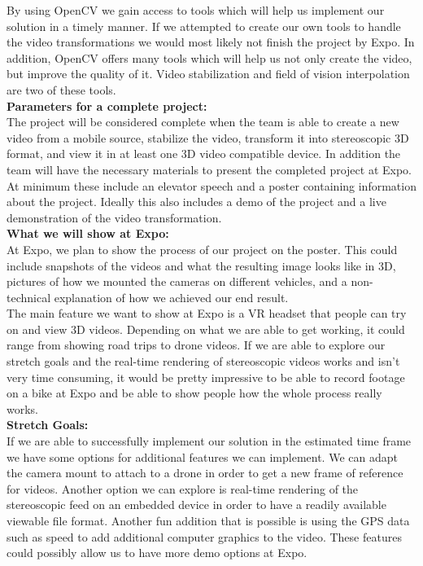 \documentclass[10pt,draftclsnofoot,onecolumn]{IEEEtran}
\begin{document}
By using OpenCV we gain access to tools which will help us implement our solution in a timely manner. If we attempted to create our own tools to handle the video transformations we would most likely not finish the project by Expo. In addition, OpenCV offers many tools which will help us not only create the video, but improve the quality of it. Video stabilization and field of vision interpolation are two of these tools.
 \\




{\Medium\textbf{Parameters for a complete project:}}\\

The project will be considered complete when the team is able to create a new video from a mobile source, stabilize the video, transform it into stereoscopic 3D format, and view it in at least one 3D video compatible device. In addition the team will have the necessary materials to present the completed project at Expo. At minimum these include an elevator speech and a poster containing information about the project. Ideally this also includes a demo of the project and a live demonstration of the video transformation.
\\


{\Medium\textbf{What we will show at Expo:}}\\

At Expo, we plan to show the process of our project on the poster. This could include snapshots of the videos and what the resulting image looks like in 3D, pictures of how we mounted the cameras on different vehicles, and a non-technical explanation of how we achieved our end result.\\

The main feature we want to show at Expo is a VR headset that people can try on and view 3D videos. Depending on what we are able to get working, it could range from showing road trips to drone videos. If we are able to explore our stretch goals and the real-time rendering of stereoscopic videos works and isn’t very time consuming, it would be pretty impressive to be able to record footage on a bike at Expo and be able to show people how the whole process really works.
\\

{\Medium\textbf{Stretch Goals:}} \\

If we are able to successfully implement our solution in the estimated time frame we have some options for additional features we can implement. We can adapt the camera mount to attach to a drone in order to get a new frame of reference for videos. Another option we can explore is real-time rendering of the stereoscopic feed on an embedded device in order to have a readily available viewable file format. Another fun addition that is possible is using the GPS data such as speed to add additional computer graphics to the video. These features could possibly allow us to have more demo options at Expo.

\end{document}
